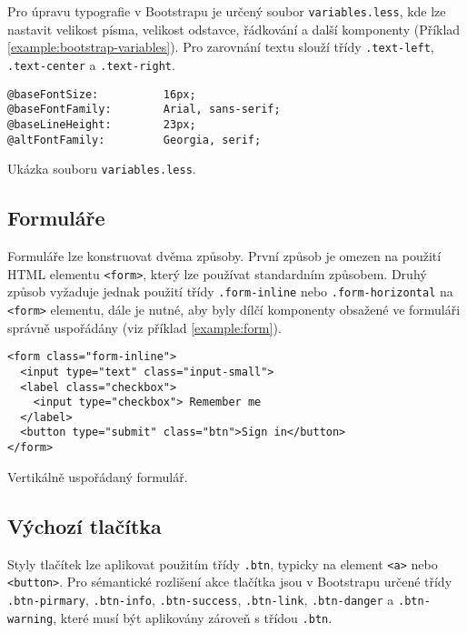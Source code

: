 Pro úpravu typografie v Bootstrapu je určený soubor \texttt{variables.less}, kde lze nastavit velikost písma, velikost odstavce, řádkování a další komponenty (Příklad \ref{example:bootstrap-variables}). Pro zarovnání textu slouží třídy \texttt{.text-left}, \texttt{.text-center} a \texttt{.text-right}.

\begin{example}
    \centering
    \begin{lstlisting}
@baseFontSize:          16px;
@baseFontFamily:        Arial, sans-serif;
@baseLineHeight:        23px;
@altFontFamily:         Georgia, serif;
    \end{lstlisting}
    \caption{Ukázka souboru \texttt{variables.less}.}
    \label{example:bootstrap-variables}
\end{example}

\subsection{Formuláře}

Formuláře lze konstruovat dvěma způsoby. První způsob je omezen na použití HTML elementu \texttt{<form>}, který lze používat standardním způsobem. Druhý způsob vyžaduje jednak použití třídy \texttt{.form-inline} nebo \texttt{.form-horizontal} na \texttt{<form>} elementu, dále je nutné, aby byly dílčí komponenty obsažené ve formuláři správně uspořádány (viz příklad \ref{example:form}).

\begin{example}
    \centering
    \begin{lstlisting}
<form class="form-inline">
  <input type="text" class="input-small">
  <label class="checkbox">
    <input type="checkbox"> Remember me
  </label>
  <button type="submit" class="btn">Sign in</button>
</form>
    \end{lstlisting}
    \caption{Vertikálně uspořádaný formulář.}
    \label{example:form}
\end{example}

\subsection{Výchozí tlačítka}

Styly tlačítek lze aplikovat použitím třídy \texttt{.btn}, typicky na element \texttt{<a>} nebo \texttt{<button>}. Pro sémantické rozlišení akce tlačítka jsou v Bootstrapu určené třídy \texttt{.btn-pirmary}, \texttt{.btn-info}, \texttt{.btn-success}, \texttt{.btn-link}, \texttt{.btn-danger} a \texttt{.btn-warning}, které musí být aplikovány zároveň s třídou \texttt{.btn}.

